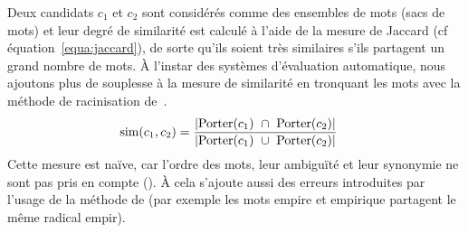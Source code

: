         Deux candidats $c_1$ et $c_2$ sont considérés comme des ensembles de
        mots (sacs de mots) et leur degré de similarité est calculé à l'aide de
        la mesure de Jaccard (cf équation~\ref{equa:jaccard}), de sorte qu'ils
        soient très similaires s'ils partagent un grand nombre de mots.
        À l'instar des systèmes d'évaluation automatique, nous ajoutons plus de
        souplesse à la mesure de similarité en tronquant les mots avec la
        méthode de racinisation de~.
        \begin{align}
          \text{sim}(c_1, c_2) &= \frac{|\textnormal{Porter}(c_1)\ \cap\ \textnormal{Porter}(c_2)|}{|\textnormal{Porter}(c_1)\ \cup\ \textnormal{Porter}(c_2)|} \label{equa:jaccard}
        \end{align}
        Cette mesure est \og{}naïve\fg{}, car l'ordre des mots, leur ambiguïté
        et leur synonymie ne sont pas pris en compte (). À cela
        s'ajoute aussi des erreurs introduites par l'usage de la méthode de
         (par exemple les mots
        \og{}empire\fg{} et \og{}empirique\fg{} partagent le même radical
        \og{}empir\fg{}).

